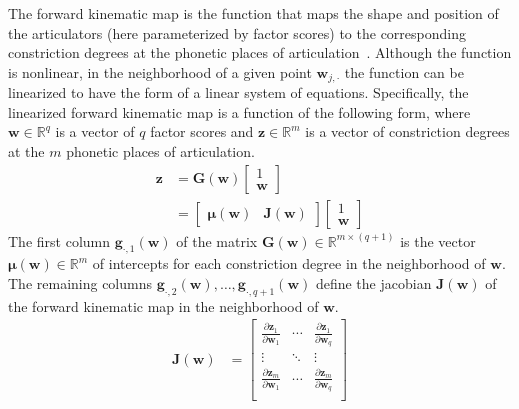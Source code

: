 \documentclass[preprint]{JASAnew}\usepackage[]{graphicx}\usepackage[]{color}
\begin{document}
The forward kinematic map is the function that maps the shape and position of the articulators (here parameterized by factor scores) to the corresponding constriction degrees at the phonetic places of articulation~\citep{lammert2013statistical}. 
%
Although the function is nonlinear, in the neighborhood of a given point $\mathbf{w}_{j,\cdot}$ the function can be linearized to have the form of a linear system of equations.
%
Specifically, the linearized forward kinematic map is a function of the following form, where $\mathbf{w} \in \mathbb{R}^q$ is a vector of $q$ factor scores and $\mathbf{z} \in \mathbb{R}^{m}$ is a vector of constriction degrees at the $m$ phonetic places of articulation.
%
\begin{align}
\mathbf{z} 
&= 
\mathbf{G}\left( \mathbf{w} \right) 
\left[ \begin{array}{c} 1 \\ \mathbf{w} \end{array} \right] \\
&= 
\left[ \begin{array}{cc} 
\boldsymbol{\mu}\left(\mathbf{w}\right) & \mathbf{J}\left(\mathbf{w}\right) 
\end{array} \right]
\left[ \begin{array}{c} 1 \\ \mathbf{w} \end{array} \right]
\end{align}
%
The first column $\mathbf{g}_{\cdot,1}(\mathbf{w})$ of the matrix $\mathbf{G}(\mathbf{w}) \in \mathbb{R}^{m\times (q+1)}$ is the vector $\boldsymbol{\mu}(\mathbf{w}) \in \mathbb{R}^m$ of intercepts for each constriction degree in the neighborhood of $\mathbf{w}$. 
%
The remaining columns $\mathbf{g}_{\cdot,2}(\mathbf{w}), \ldots, \mathbf{g}_{\cdot,q+1}(\mathbf{w})$ define the jacobian $\mathbf{J}(\mathbf{w})$ of the forward kinematic map in the neighborhood of $\mathbf{w}$. 
% 
\begin{align}
\mathbf{J}(\mathbf{w}) 
&=
\left[ \begin{array}{ccc} 
\frac{\partial \mathbf{z}_1}{\partial \mathbf{w}_1} & \cdots & \frac{\partial \mathbf{z}_1}{\partial \mathbf{w}_q} \\
\vdots & \ddots & \vdots \\
\frac{\partial \mathbf{z}_m}{\partial \mathbf{w}_1} & \cdots & \frac{\partial \mathbf{z}_m}{\partial \mathbf{w}_q} \\
\end{array} \right]
\end{align}
\end{document}
